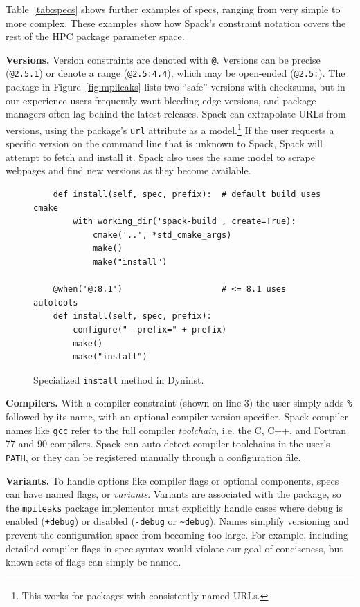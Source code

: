 Table~\ref{tab:specs} shows further examples of specs, ranging from very
simple to more complex. These examples show how Spack's constraint
notation covers the rest of the HPC package parameter space.

{\bf Versions.}
Version constraints are denoted with {\tt @}. Versions
can be precise ({\tt @2.5.1}) or denote a range ({\tt @2.5:4.4}),
which may be open-ended ({\tt @2.5:}).
%
The package in Figure~\ref{fig:mpileaks} lists two ``safe'' versions with
checksums, but
in our experience users frequently want bleeding-edge versions, and package managers
often lag behind the latest releases.
Spack can extrapolate URLs from versions,
using the package's {\tt url} attribute as a model.\footnote{This works
for packages with consistently named URLs.}  If the user requests a specific
version on the command line that is unknown to Spack,
Spack will attempt to fetch and install it.  Spack also uses the same
model to scrape webpages and find new versions as they become available.

\begin{figure}
\begin{verbatim}
    def install(self, spec, prefix):  # default build uses cmake
        with working_dir('spack-build', create=True):
            cmake('..', *std_cmake_args)
            make()
            make("install")

    @when('@:8.1')                    # <= 8.1 uses autotools
    def install(self, spec, prefix):
        configure("--prefix=" + prefix)
        make()
        make("install")
\end{verbatim}
\caption{
    Specialized {\tt install} method in Dyninst.
	\label{fig:specialization}
}
\end{figure}

{\bf Compilers.}
With a compiler constraint (shown on line 3) the user
simply adds {\tt \%} followed by its name, with an optional compiler version
specifier.  Spack compiler names like {\tt gcc} refer to the full compiler {\it toolchain},
i.e. the C, C++, and Fortran 77 and 90 compilers.  Spack can auto-detect
compiler toolchains in the user's {\tt PATH}, or they can be registered manually
through a configuration file.

{\bf Variants.}
To handle options like compiler flags or optional components, specs can
have named flags, or {\it variants}.  Variants are associated with the package,
so the {\tt mpileaks} package implementor must explicitly handle cases
where debug is enabled ({\tt +debug}) or disabled ({\tt -debug}
or {\tt \textasciitilde \ignorespaces debug}).  Names simplify versioning
and prevent the configuration space from becoming too large.
For example, including detailed compiler flags in spec syntax
would violate our goal of conciseness, but known sets of flags can simply be named.

